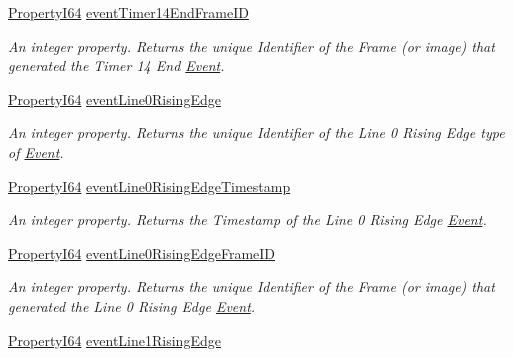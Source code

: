 \begin{DoxyCompactItemize}
\hyperlink{group___common_interface_ga81749b2696755513663492664a18a893}{Property\+I64} \hyperlink{classmv_i_m_p_a_c_t_1_1acquire_1_1_gen_i_cam_1_1_event_control_a3825bcea903814c269d3a75f384dd7c3}{event\+Timer14\+End\+Frame\+I\+D}
\begin{DoxyCompactList}\small\item\em An integer property. Returns the unique Identifier of the Frame (or image) that generated the Timer 14 End \hyperlink{classmv_i_m_p_a_c_t_1_1acquire_1_1_event}{Event}. \end{DoxyCompactList}\item 
\hyperlink{group___common_interface_ga81749b2696755513663492664a18a893}{Property\+I64} \hyperlink{classmv_i_m_p_a_c_t_1_1acquire_1_1_gen_i_cam_1_1_event_control_a82796909493c32b1aac1566abc44812d}{event\+Line0\+Rising\+Edge}
\begin{DoxyCompactList}\small\item\em An integer property. Returns the unique Identifier of the Line 0 Rising Edge type of \hyperlink{classmv_i_m_p_a_c_t_1_1acquire_1_1_event}{Event}. \end{DoxyCompactList}\item 
\hyperlink{group___common_interface_ga81749b2696755513663492664a18a893}{Property\+I64} \hyperlink{classmv_i_m_p_a_c_t_1_1acquire_1_1_gen_i_cam_1_1_event_control_a5ac8a736d0b501397a09270699ddcb7e}{event\+Line0\+Rising\+Edge\+Timestamp}
\begin{DoxyCompactList}\small\item\em An integer property. Returns the Timestamp of the Line 0 Rising Edge \hyperlink{classmv_i_m_p_a_c_t_1_1acquire_1_1_event}{Event}. \end{DoxyCompactList}\item 
\hyperlink{group___common_interface_ga81749b2696755513663492664a18a893}{Property\+I64} \hyperlink{classmv_i_m_p_a_c_t_1_1acquire_1_1_gen_i_cam_1_1_event_control_ad38c8b4956d701e964618ad08b548312}{event\+Line0\+Rising\+Edge\+Frame\+I\+D}
\begin{DoxyCompactList}\small\item\em An integer property. Returns the unique Identifier of the Frame (or image) that generated the Line 0 Rising Edge \hyperlink{classmv_i_m_p_a_c_t_1_1acquire_1_1_event}{Event}. \end{DoxyCompactList}\item 
\hyperlink{group___common_interface_ga81749b2696755513663492664a18a893}{Property\+I64} \hyperlink{classmv_i_m_p_a_c_t_1_1acquire_1_1_gen_i_cam_1_1_event_control_ad8750a4927c8d0ecca363c8ebc9949c0}{event\+Line1\+Rising\+Edge}

\end{DoxyCompactItemize}
